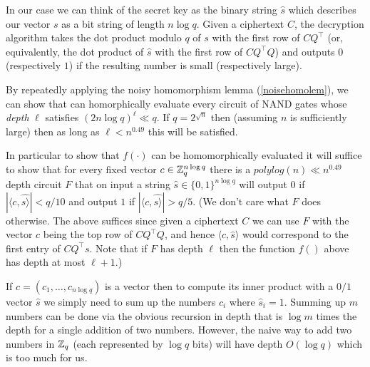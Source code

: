 In our case we can think of the secret key as the binary string
\(\hat{s}\) which describes our vector \(s\) as a bit string of length
\(n\log q\). Given a ciphertext \(C\), the decryption algorithm takes
the dot product modulo \(q\) of \(s\) with the first row of
\(\ensuremath{\mathit{CQ}}^\top\) (or, equivalently, the dot product of
\(\hat{s}\) with the first row of \(\ensuremath{\mathit{CQ}}^\top Q\))
and outputs \(0\) (respectively \(1\)) if the resulting number is small
(respectively large).

By repeatedly applying the noisy homomorphism lemma
(\cref{noisehomolem}), we can show that can homorphically evaluate every
circuit of NAND gates whose \emph{depth} \(\ell\) satisfies
\((2n\log q)^\ell \ll q\). If \(q = 2^{\sqrt{n}}\) then (assuming \(n\)
is sufficiently large) then as long as \(\ell < n^{0.49}\) this will be
satisfied.

In particular to show that \(f(\cdot)\) can be homomorphically evaluated
it will suffice to show that for every fixed vector
\(c\in {\mathbb{Z}}_q^{n\log q}\) there is a \(polylog(n) \ll n^{0.49}\) depth
circuit \(F\) that on input a string \(\hat{s}\in\{0,1\}^{n \log q}\)
will output \(0\) if \(|\langle c,\hat{s \rangle}| < q/10\) and output
\(1\) if \(|\langle c,\hat{s \rangle}| > q/5\). (We don't care what
\(F\) does otherwise. The above suffices since given a ciphertext \(C\)
we can use \(F\) with the vector \(c\) being the top row of
\(\ensuremath{\mathit{CQ}}^\top Q\), and hence
\(\langle c,\hat{s} \rangle\) would correspond to the first entry of
\(\ensuremath{\mathit{CQ}}^\top s\). Note that if \(F\) has depth
\(\ell\) then the function \(f()\) above has depth at most \(\ell+1\).)


If \(c=(c_1,\ldots,c_{n\log q})\) is a vector then to compute its inner
product with a \(0/1\) vector \(\hat{s}\) we simply need to sum up the
numbers \(c_i\) where \(\hat{s}_i=1\). Summing up \(m\) numbers can be
done via the obvious recursion in depth that is \(\log m\) times the
depth for a single addition of two numbers. However, the naive way to
add two numbers in \({\mathbb{Z}}_q\) (each represented by \(\log q\) bits) will
have depth \(O(\log q)\) which is too much for us.


